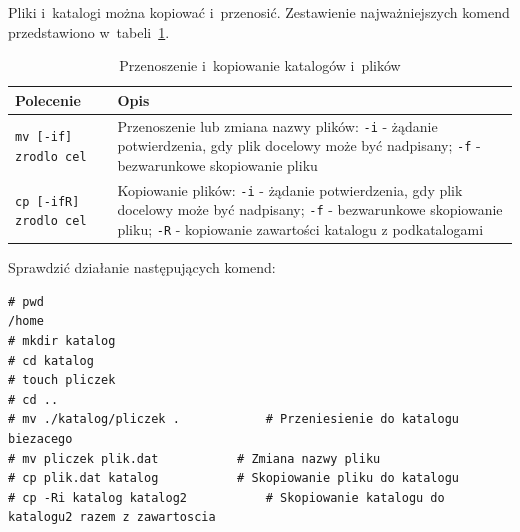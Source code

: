 \begin{example}

Pliki i~katalogi można kopiować i~przenosić. Zestawienie najważniejszych komend przedstawiono w~tabeli~\ref{tab:przenos}. 

\begin{table}[h!]
\centering
\caption{Przenoszenie i~kopiowanie katalogów i~plików}
\setlength{\arrayrulewidth}{1pt}
\setlength{\tabcolsep}{6pt}
\renewcommand{\arraystretch}{1.2}
\begin{tabular}{ |p{}|p{}|}
\hline \rowcolor{gray}
\textbf{Polecenie} & \textbf{Opis} \\ \hline
\mbox{\lstinline[deletekeywords={if}]{mv [-if] zrodlo cel}} & Przenoszenie lub zmiana nazwy plików: \mbox{\lstinline[style=MyBashStyle]{-i}} - żądanie potwierdzenia, gdy plik docelowy może być nadpisany; \mbox{\lstinline[style=MyBashStyle]{-f}} - bezwarunkowe skopiowanie pliku \\ \hline 
\mbox{\lstinline[style=MyBashStyle]{cp [-ifR] zrodlo cel}}  & Kopiowanie plików: \mbox{\lstinline[style=MyBashStyle]{-i}} - żądanie potwierdzenia, gdy plik docelowy może być nadpisany; \mbox{\lstinline[style=MyBashStyle]{-f}} - bezwarunkowe skopiowanie pliku; \mbox{\lstinline[style=MyBashStyle]{-R}} - kopiowanie zawartości katalogu z podkatalogami \\ \hline
\end{tabular}
\label{tab:przenos}
\end{table}

Sprawdzić działanie następujących komend: 

\begin{lstlisting}[style=MyBashStyle]
# pwd
/home 
# mkdir katalog
# cd katalog 
# touch pliczek
# cd ..
# mv ./katalog/pliczek .			# Przeniesienie do katalogu biezacego
# mv pliczek plik.dat			# Zmiana nazwy pliku
# cp plik.dat katalog			# Skopiowanie pliku do katalogu
# cp -Ri katalog katalog2			# Skopiowanie katalogu do katalogu2 razem z zawartoscia
\end{lstlisting}
\end{example}


